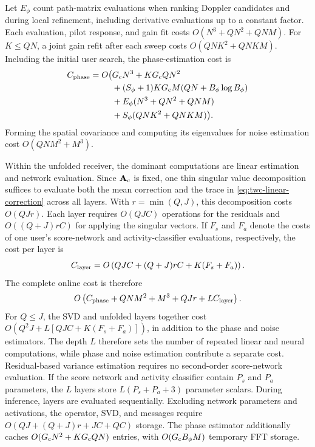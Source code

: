 Let $E_\phi$ count path-matrix evaluations when ranking Doppler candidates and during
local refinement, including derivative evaluations up to a constant
factor. Each evaluation, pilot response, and gain fit costs
$O(N^3+QN^2+QNM)$. For $K\leq QN$, a joint gain refit after each
sweep costs $O(QNK^2+QNKM)$. Including the initial user search,
the phase-estimation cost is
\begin{equation}
 \begin{aligned}
 C_{\rm phase}=O\big(&G_{\rm c}N^3+KG_{\rm c}QN^2\\
 &+(S_\phi+1)KG_{\rm c}M(QN+B_\phi\log B_\phi)\\
 &+E_\phi(N^3+QN^2+QNM)\\
 &+S_\phi(QNK^2+QNKM)\big).
 \end{aligned}
 \label{eq:twc-phase-complexity}
\end{equation}
Forming the spatial covariance and computing its eigenvalues for
noise estimation cost $O(QNM^2+M^3)$.

Within the unfolded receiver, the dominant computations are linear
estimation and network evaluation.
Since $\mathbf A_{\rm c}$ is fixed, one thin singular
value decomposition suffices to evaluate both the mean correction
and the trace in \eqref{eq:twc-linear-correction} across all layers.
With $r=\min(Q,J)$, this decomposition costs $O(QJr)$.
Each layer requires $O(QJC)$ operations for the residuals and
$O((Q+J)rC)$ for applying the singular vectors. If $F_s$ and $F_a$
denote the costs of one user's score-network and activity-classifier
evaluations, respectively, the cost per layer is
\begin{equation}
 C_{\rm layer}=O\left(QJC+(Q+J)rC+K(F_s+F_a)\right).
 \label{eq:twc-layer-complexity}
\end{equation}
The complete online cost is therefore
\begin{equation}
 O\left(C_{\rm phase}+QNM^2+M^3+QJr+L C_{\rm layer}\right).
 \label{eq:twc-complexity}
\end{equation}
For $Q\leq J$, the SVD and unfolded layers together cost
$O(Q^2J+L[QJC+K(F_s+F_a)])$, in addition to the phase and noise
estimators.
The depth $L$ therefore sets the number of repeated linear and neural
computations, while phase and noise estimation contribute a separate
cost. Residual-based variance estimation requires no second-order
score-network evaluation.
If the score network and activity classifier contain $P_s$ and $P_a$
parameters, the $L$ layers store $L(P_s+P_a+3)$ parameter scalars.
During inference, layers are evaluated sequentially. Excluding network
parameters and activations, the operator, SVD, and messages require
$O(QJ+(Q+J)r+JC+QC)$ storage. The phase estimator additionally
caches $O(G_{\rm c}N^2+KG_{\rm c}QN)$ entries, with
$O(G_{\rm c}B_\phi M)$ temporary FFT storage.

